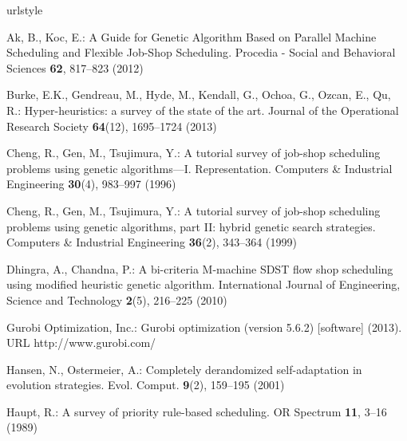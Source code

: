 \documentclass[graybox]{svmult}
\begin{document}
\clearpage

%
\begin{thebibliography}{10}
    \providecommand{\url}[1]{{#1}}
    \providecommand{\urlprefix}{URL }
    \expandafter\ifx\csname urlstyle\endcsname\relax
    \providecommand{\doi}[1]{DOI~\discretionary{}{}{}#1}\else
    \providecommand{\doi}{DOI~\discretionary{}{}{}\begingroup
        \urlstyle{rm}\Url}\fi
    
    Ak, B., Koc, E.: {A Guide for Genetic Algorithm Based on Parallel Machine
        Scheduling and Flexible Job-Shop Scheduling}.
    \newblock Procedia - Social and Behavioral Sciences \textbf{62}, 817--823
    (2012)
    
    Burke, E.K., Gendreau, M., Hyde, M., Kendall, G., Ochoa, G., Ozcan, E., Qu, 
    R.:
    Hyper-heuristics: a survey of the state of the art.
    \newblock Journal of the Operational Research Society \textbf{64}(12),
    1695--1724 (2013)
    
    Cheng, R., Gen, M., Tsujimura, Y.: {A tutorial survey of job-shop scheduling
        problems using genetic algorithms—I. Representation}.
    \newblock Computers \& Industrial Engineering \textbf{30}(4), 983--997 
    (1996)
    
    Cheng, R., Gen, M., Tsujimura, Y.: {A tutorial survey of job-shop scheduling
        problems using genetic algorithms, part II: hybrid genetic search
        strategies}.
    \newblock Computers \& Industrial Engineering \textbf{36}(2), 343--364 
    (1999)
    
    Dhingra, A., Chandna, P.: {A bi-criteria M-machine SDST flow shop scheduling
        using modified heuristic genetic algorithm}.
    \newblock International Journal of Engineering, Science and Technology
    \textbf{2}(5), 216--225 (2010)
    
    {Gurobi Optimization, Inc.}: Gurobi optimization (version 5.6.2) [software]
    (2013).
    \newblock \urlprefix\url{http://www.gurobi.com/}
    
    Hansen, N., Ostermeier, A.: Completely derandomized self-adaptation in
    evolution strategies.
    \newblock Evol. Comput. \textbf{9}(2), 159--195 (2001)
    
    Haupt, R.: A survey of priority rule-based scheduling.
    \newblock OR Spectrum \textbf{11}, 3--16 (1989)
    

\end{thebibliography}
\end{document}
